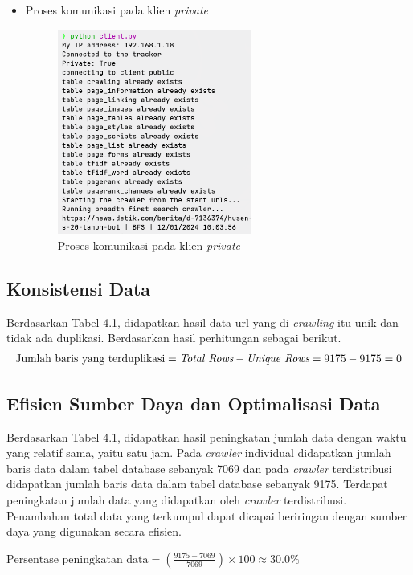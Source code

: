 \begin{itemize}
	\item{Proses komunikasi pada klien \emph{private}}
	\begin{figure}[H]
		\centering{}
		\includegraphics[width=0.6\textwidth]{gambar/kode/uji_client_private}
		\caption{Proses komunikasi pada klien \emph{private}}
	\end{figure}
\end{itemize}

\subsection{Konsistensi Data}
Berdasarkan Tabel 4.1, didapatkan hasil data url yang di-\emph{crawling} itu unik dan tidak ada duplikasi. Berdasarkan hasil perhitungan sebagai berikut.
\[
\text{Jumlah baris yang terduplikasi} = \emph{Total Rows} - \emph{Unique Rows} = 9175 - 9175 = 0
\]

\subsection{Efisien Sumber Daya dan Optimalisasi Data}
Berdasarkan Tabel 4.1, didapatkan hasil peningkatan jumlah data dengan waktu yang relatif sama, yaitu satu jam. Pada \emph{crawler} individual didapatkan jumlah baris data dalam tabel database sebanyak 7069 dan pada \emph{crawler} terdistribusi didapatkan jumlah baris data dalam tabel database sebanyak 9175. Terdapat peningkatan jumlah data yang didapatkan oleh \emph{crawler} terdistribusi. Penambahan total data yang terkumpul dapat dicapai beriringan dengan sumber daya yang digunakan secara efisien.

$\text{Persentase peningkatan data} = \left( \frac{9175 - 7069}{7069} \right) \times 100 \approx 30.0\%$

